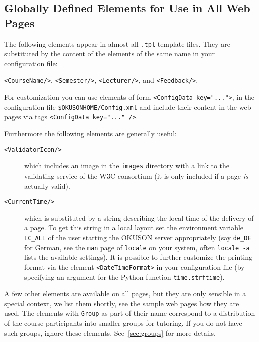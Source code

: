 \documentclass[12pt,openany,a4paper]{book}
\newcommand{\OKUSON}{\textsf{OKUSON}}
\begin{document}
\subsection{Globally Defined Elements for Use in All Web Pages}

The following elements appear in almost all \texttt{.tpl} template files. 
They are substituted 
by the content of the elements of the same name in your configuration file:

\texttt{<CourseName/>}, \texttt{<Semester/>}, \texttt{<Lecturer/>},
and \texttt{<Feedback/>}.

For customization you can use elements of form \texttt{<ConfigData key="...">},
in the configuration file \texttt{\$OKUSONHOME/Config.xml} 
and include their content in the web pages via tags 
\texttt{<ConfigData key="..." />}. 

Furthermore the following elements are generally useful:
\begin{description}
\item[\texttt{<ValidatorIcon/>}] which includes an image in
the \texttt{images} directory with a link to the validating service of the
W3C consortium (it is only included if a page \emph{is} actually valid).
\item[\texttt{<CurrentTime/>}] which is substituted by a string describing
the local time of the delivery of a page. To get this string in a local
layout set the environment variable \verb+LC_ALL+ of the user starting the
{\OKUSON} server appropriately (say \verb+de_DE+ for German, see the
\texttt{man} page of \texttt{locale} on your system, often \texttt{locale
-a} lists the available settings). It is possible to further customize the 
printing format via the element \texttt{<DateTimeFormat>} in your
configuration file (by specifying an argument for the Python function
\texttt{time.strftime}).
\end{description}

A few other elements are available on all pages, but they are only sensible in
a special context, we list them shortly, see the sample web pages how they
are used. The elements with \texttt{Group} as part of their name correspond
to a distribution of the course participants into smaller groups for
tutoring. If you do not have such groups, ignore these elements.
See~\ref{sec:groups} for more details.
\end{document}
